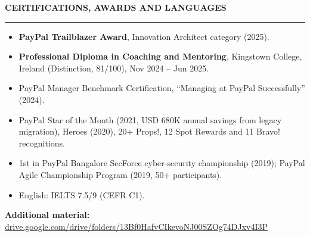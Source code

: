 \documentclass[10pt,a4paper]{article}
\newcommand{\bd}[1]{\textbf{#1}}
\newcommand{\sect}[1]{%
  \par\vspace{8pt}%
  {\bfseries\fontsize{10.8}{12.5}\selectfont #1}\par\nointerlineskip
  \vspace{1.5pt}\noindent\rule{\linewidth}{0.6pt}\par\vspace{4pt}}
\begin{document}
\sect{CERTIFICATIONS, AWARDS AND LANGUAGES}
\begin{itemize}
\item \bd{PayPal Trailblazer Award}, Innovation Architect category (2025).
\item \bd{Professional Diploma in Coaching and Mentoring}, Kingstown College, Ireland
  (Distinction, 81/100), Nov 2024 -- Jun 2025.
\item PayPal Manager Benchmark Certification, ``Managing at PayPal Successfully'' (2024).
\item PayPal Star of the Month (2021, USD 680K annual savings from legacy migration), Heroes
  (2020), 20+ Props!, 12 Spot Rewards and 11 Bravo! recognitions.
\item 1st in PayPal Bangalore SecForce cyber-security championship (2019); PayPal Agile
  Championship Program (2019, 50+ participants).
\item English: IELTS 7.5/9 (CEFR C1).
\end{itemize}
\par\vspace{3pt}\noindent\textbf{Additional material:}
\href{https://drive.google.com/drive/folders/13Bf0HafvCIkevoNJ00SZOg74DJxv4I3P}{drive.google.com/drive/folders/13Bf0HafvCIkevoNJ00SZOg74DJxv4I3P}
\end{document}
